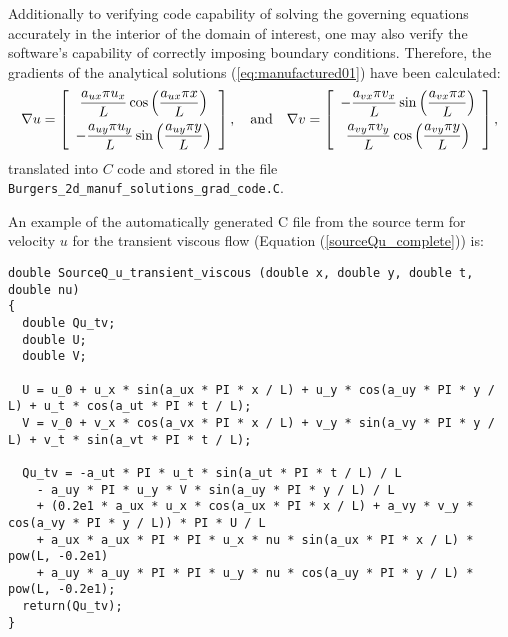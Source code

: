 \documentclass[10pt]{article}
\begin{document}
Additionally to verifying code capability of solving the governing equations accurately in the interior of the domain of interest, one may also verify the software's capability of correctly imposing boundary conditions. Therefore, the gradients of the  analytical solutions (\ref{eq:manufactured01}) have been calculated:
\begin{equation*}
\nabla u = \left[ \begin{array}{c}
  \dfrac{  a_{ux}  \pi u_x}{L} \cos\left( \dfrac{ a_{ux}  \pi  x}{L}\right)\vspace{5pt}\\
 -   \dfrac{  a_{uy}  \pi u_y}{L} \sin\left( \dfrac{ a_{uy}  \pi  y}{L}\right)
\end{array} \right],
\quad\mbox{and}\quad
\nabla  v= \left[ \begin{array}{c}
-  \dfrac{  a_{vx}  \pi v_x}{L}  \sin\left( \dfrac{ a_{vx}  \pi  x}{L}\right)\vspace{5pt}\\
    \dfrac{  a_{vy}  \pi v_y}{L} \cos\left( \dfrac{ a_{vy}  \pi  y}{L}\right)
\end{array} \right],
\end{equation*}
translated into  $C$ code  and stored in the file \texttt{Burgers\_2d\_manuf\_solutions\_grad\_code.C}.


An example of the automatically generated C file from the source term for velocity $u$ for the transient viscous flow (Equation (\ref{sourceQu_complete})) is:
\begin{small}
\begin{verbatim}
double SourceQ_u_transient_viscous (double x, double y, double t, double nu)
{
  double Qu_tv;
  double U;
  double V;

  U = u_0 + u_x * sin(a_ux * PI * x / L) + u_y * cos(a_uy * PI * y / L) + u_t * cos(a_ut * PI * t / L);
  V = v_0 + v_x * cos(a_vx * PI * x / L) + v_y * sin(a_vy * PI * y / L) + v_t * sin(a_vt * PI * t / L);

  Qu_tv = -a_ut * PI * u_t * sin(a_ut * PI * t / L) / L
    - a_uy * PI * u_y * V * sin(a_uy * PI * y / L) / L
    + (0.2e1 * a_ux * u_x * cos(a_ux * PI * x / L) + a_vy * v_y * cos(a_vy * PI * y / L)) * PI * U / L
    + a_ux * a_ux * PI * PI * u_x * nu * sin(a_ux * PI * x / L) * pow(L, -0.2e1)
    + a_uy * a_uy * PI * PI * u_y * nu * cos(a_uy * PI * y / L) * pow(L, -0.2e1);
  return(Qu_tv);
}
\end{verbatim}
\end{small}


 

\end{document}
